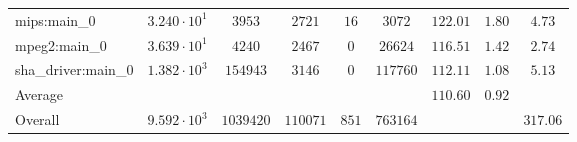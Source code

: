 \begin{tabular}{|l|c|c|c|c|c|c|c|c|}
mips:main\_0            & $ 3.240 \cdot 10^{1} $ & $ 3953    $ & $ 2721   $ & $ 16  $ & $ 3072   $ & $ 122.01      $ & $ 1.80    $ & $ 4.73    $ \\
mpeg2:main\_0           & $ 3.639 \cdot 10^{1} $ & $ 4240    $ & $ 2467   $ & $ 0   $ & $ 26624  $ & $ 116.51      $ & $ 1.42    $ & $ 2.74    $ \\
sha\_driver:main\_0     & $ 1.382 \cdot 10^{3} $ & $ 154943  $ & $ 3146   $ & $ 0   $ & $ 117760 $ & $ 112.11      $ & $ 1.08    $ & $ 5.13    $ \\
\hline
Average                 & $                    $ & $         $ & $        $ & $     $ & $        $ & $ 110.60      $ & $ 0.92    $ & $         $ \\
\hline
Overall                 & $ 9.592 \cdot 10^{3} $ & $ 1039420 $ & $ 110071 $ & $ 851 $ & $ 763164 $ & $             $ & $         $ & $ 317.06  $ \\
\hline
\end{tabular}
